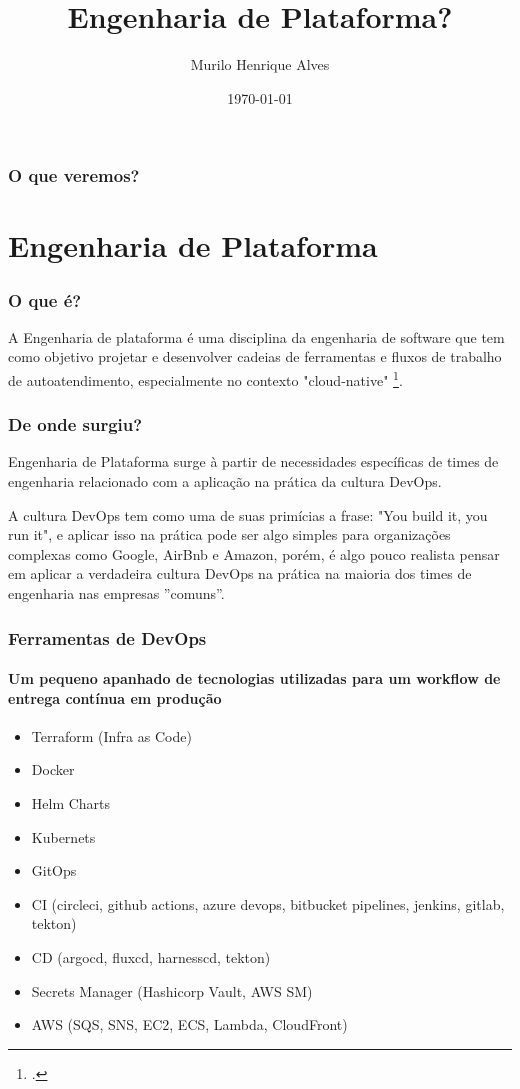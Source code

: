 \documentclass[
	11pt,
	aspectratio=169,
]{beamer}
\title[Engenharia de Plataforma]{Engenharia de Plataforma?}
\author[Murilo Alves]{Murilo Henrique Alves}
\institute[UTFPR]{Universidade Tecnológica Federal do Paraná}
\date[\today]{\today}
\begin{document}
\begin{frame}
	\titlepage
\end{frame}

\begin{frame}
	\frametitle{O que veremos?}
	
	\tableofcontents
\end{frame}


\section{Engenharia de Plataforma}

\begin{frame}
	\frametitle{O que é?}

	A Engenharia de plataforma é uma disciplina da engenharia de software que tem como objetivo
  projetar e desenvolver cadeias de ferramentas e fluxos de trabalho de autoatendimento,
  especialmente no contexto "cloud-native" \footcite{galante}.
\end{frame}

\begin{frame}
	\frametitle{De onde surgiu?}

	Engenharia de Plataforma surge à partir de necessidades específicas de times de engenharia relacionado com
	a aplicação na prática da cultura DevOps.

	\bigskip

	A cultura DevOps tem como uma de suas primícias a frase: "You build it, you run it", e aplicar isso na prática
	pode ser algo simples para organizações complexas como Google, AirBnb e Amazon, porém, é algo pouco realista pensar
	em aplicar a verdadeira cultura DevOps na prática na maioria dos times de engenharia nas empresas ''comuns''.

\end{frame}

\begin{frame}
  \frametitle{Ferramentas de DevOps}
	\framesubtitle{Um pequeno apanhado de tecnologias utilizadas para um workflow de entrega contínua em produção}

	\begin{itemize}
		\item Terraform (Infra as Code)
		\item Docker
		\item Helm Charts
		\item Kubernets
		\item GitOps
		\item CI (circleci, github actions, azure devops, bitbucket pipelines, jenkins, gitlab, tekton)
		\item CD (argocd, fluxcd, harnesscd, tekton)
		\item Secrets Manager (Hashicorp Vault, AWS SM)
		\item AWS (SQS, SNS, EC2, ECS, Lambda, CloudFront)
	\end{itemize}

\end{frame}
\end{document}
